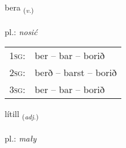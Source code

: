 \documentclass[frontgrid, backgrid]{flacards}\usepackage[]{graphicx}\usepackage[]{xcolor}
\begin{document}
\renewcommand{\blhead}{\vskip5pt {\small\bfseries\footnotesize Sagnorð | Verb }}
\renewcommand{\bcfoot}{\vskip5pt \hspace{2pt}{\small\bfseries\footnotesize 1K}}


{bera \small{\textsubscript{(\textit{v.})}} \\[1ex] %
\textphonetic{[pɛːra]} \\
pl.: \emph{nosić} \\  [2ex]
\renewcommand*{\arraystretch}{0.8}
\begin{tabular}{p{1cm}l}
\textsc{1sg}: & ber -- bar -- borið \\ 
\textsc{2sg}: & berð -- barst -- borið \\ 
\textsc{3sg}: & ber -- bar -- borið \\ 
\end{tabular}
}

\renewcommand{\flhead}{\vskip5pt \fboxsep=0pt {\small\bfseries\footnotesize Lýsingarorð | Adjective}}
\renewcommand{\fcfoot}{\vskip5pt \fboxsep=0pt \hspace{2pt}{\small\bfseries\footnotesize 1K}}

\renewcommand{\blhead}{\vskip5pt {\small\bfseries\footnotesize Lýsingarorð | Adjective }}
\renewcommand{\bcfoot}{\vskip5pt \hspace{2pt}{\small\bfseries\footnotesize 1K}}


{lítill \small{\textsubscript{(\textit{adj.})}} \\[1ex] %
\textphonetic{[liːtɪtl̥]} \\
pl.: \emph{mały} \\  [2ex]
\renewcommand*{\arraystretch}{0.8}
}
\end{document}
